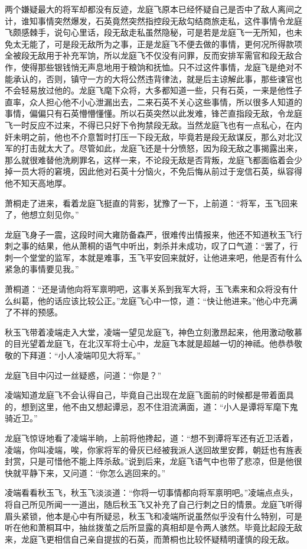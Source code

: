 两个嫌疑最大的将军却都没有反迹，龙庭飞原本已经怀疑自己是否中了敌人离间之计，谁知事情突然爆发，石英竟然突然指控段无敌勾结商旅走私，这件事情令龙庭飞颇感棘手，说句心里话，段无敌走私虽然隐秘，可是若是龙庭飞一无所知，也未免太无能了，可是段无敌所为之事，正是龙庭飞不便去做的事情，更何况所得款项全被段无敌用于补充军饷，所以龙庭飞不仅没有问罪，反而安排军需官和段无敌合作，使得那些银钱悄无声息地用于粮饷和抚恤。只不过这件事情，龙庭飞是绝对不能承认的，否则，镇守一方的大将公然违背律法，就是后主谅解此事，那些谏官也不会轻易放过他的。龙庭飞麾下众将，大多都知道一些，只有石英，一来是他性子直率，众人担心他不小心泄漏出去，二来石英不关心这些事情，所以很多人知道的事情，偏偏只有石英懵懵懂懂。所以石英突然以此发难，锋芒直指段无敌，令龙庭飞一时反应不过来，不得已只好下令拘禁段无敌。当然龙庭飞也有一点私心，在内奸未明之前，他也不介意暂时打压一下段无敌，毕竟若是段无敌谋反，那么对北汉军的打击就太大了。尽管如此，龙庭飞还是十分愤怒，因为段无敌之事揭露出来，那么就很难替他洗刷罪名，这样一来，不论段无敌是否背叛，龙庭飞都面临着会少掉一员大将的窘境，因此他对石英十分恼火，不免后悔从前过于宠信石英，纵容得他不知天高地厚。

萧桐走了进来，看着龙庭飞挺直的背影，犹豫了一下，上前道：“将军，玉飞回来了，他想立刻见你。”

龙庭飞身子一震，这段时间大雍防备森严，很难传出情报来，他还不知道秋玉飞行刺之事的结果，他从萧桐的语气中听出，刺杀并未成功，叹了口气道：“罢了，行刺一个堂堂的监军，本就是难事，玉飞平安回来就好，让他进来吧，他是否有什么紧急的事情要见我。”

萧桐道：“还是请他向将军禀明吧，这事关系到我军大将，玉飞素来和众将没有什么纠葛，他的话应该比较公正。”龙庭飞心中一惊，道：“快让他进来。”他心中充满了不祥的预感。

秋玉飞带着凌端走入大堂，凌端一望见龙庭飞，神色立刻激昂起来，他用激动敬慕的目光望着龙庭飞，在北汉军将士心中，龙庭飞本就是超越一切的神祗。他恭恭敬敬的下拜道：“小人凌端叩见大将军。”

龙庭飞目中闪过一丝疑惑，问道：“你是？”

凌端知道龙庭飞不会认得自己，毕竟自己出现在龙庭飞面前的时候都是带着面具的，想到这里，他不由又想起谭忌，忍不住泪流满面，道：“小人是谭将军麾下鬼骑近卫。”

龙庭飞惊讶地看了凌端半晌，上前将他搀起，道：“想不到谭将军还有近卫活着，凌端，你叫凌端，唉，你家将军的骨灰已经被我派人送回故里安葬，朝廷也有旌表封赏，只是可惜他不能上阵杀敌。”说到后来，龙庭飞语气中也带了悲凉，但是他很快就平静下来，又问道：“你怎么逃回来的。”

凌端看看秋玉飞，秋玉飞淡淡道：“你将一切事情都向将军禀明吧。”凌端点点头，将自己所见所闻一一道出，随后秋玉飞又补充了自己行刺之日的情景。龙庭飞听得眉头紧锁，他本是心中有所疑忌，秋玉飞和凌端所说虽然似乎没有什么特别，可是听在他和萧桐耳中，抽丝拨茧之后所显露的真相却是令两人骇然。毕竟比起段无敌来，龙庭飞更相信自己亲自提拔的石英，而萧桐也比较怀疑精明谨慎的段无敌。

